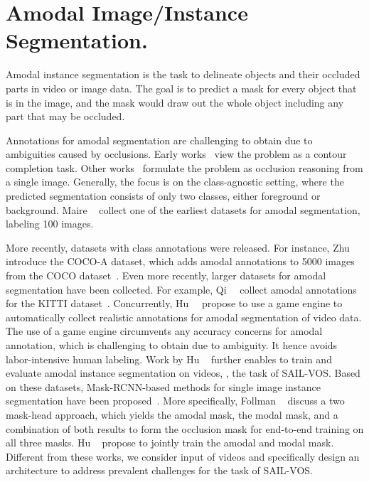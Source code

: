 \section{Amodal Image/Instance Segmentation.}
Amodal instance segmentation is the task to delineate objects and their occluded parts in video or image data. The goal is to predict a mask for every object that is in the image, and the mask would draw out the whole object including any part that may be occluded. 

Annotations for amodal segmentation are challenging to obtain due to  ambiguities caused by  occlusions. Early works~\cite{GuoECCV2012, GuptaCVPR2013, SilbermanECCV2014b, KarICCV2015} view the problem as a contour completion task. Other works~\cite{HsiaoCVPR2012, PepikCVPR2013, GhiasiCVPR2014, ChenCVPR2015, LiECCV2016}  formulate the problem as occlusion reasoning from a single image. Generally, the focus is on the class-agnostic setting, where the predicted segmentation consists of only two classes, either foreground or background. Maire \etal~\cite{maire2013hierarchical} collect one of the earliest datasets for amodal segmentation, labeling 100 images. %

More recently, datasets with class annotations were released. For instance, Zhu~\etal~\cite{zhu2017semantic} introduce the COCO-A dataset, which adds amodal annotations to 5000  images from the COCO dataset~\cite{lin2014microsoft}. Even more recently, larger datasets for amodal segmentation have been collected. For example, Qi~\etal~\cite{qi2019amodal} collect amodal annotations for the KITTI dataset~\cite{geiger2012we}. Concurrently, Hu~\etal~\cite{hu2019sail} propose to use a game engine to automatically collect realistic  annotations for amodal segmentation of video data. The use of a game engine circumvents any accuracy concerns for amodal annotation, which is %
challenging to obtain due to ambiguity. It hence avoids labor-intensive human labeling. Work by Hu \etal~\cite{hu2019sail} further enables to train and evaluate amodal instance segmentation on videos, \ie, the task of SAIL-VOS. Based on these datasets, Mask-RCNN-based methods for single image instance segmentation have been proposed~\cite{follmann2019learning, hu2019sail}. More specifically, Follman \etal~\cite{follmann2019learning} discuss a two mask-head approach, which yields the amodal mask, the modal mask, and a combination of both results to form the occlusion mask for end-to-end training on all three masks. Hu \etal~\cite{hu2019sail} propose to jointly train the amodal and modal mask. Different from these works, we consider input of videos and specifically design an architecture to address prevalent challenges for the task of SAIL-VOS.


